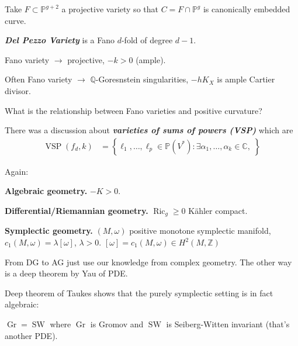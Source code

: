 Take $F\subset \mathbb{P}^{g+2}$ a projective variety so that $C=F \cap\mathbb{P}^g$ is  canonically embedded curve.

\begin{defn}\leavevmode
	\textit{\textbf{Del Pezzo Variety}} is a Fano $d$-fold of degree $d-1$.
\end{defn}

\begin{defn}\leavevmode
	Fano variety $\to $ projective, $-k>0$ (ample).
\end{defn}

\begin{remark}\leavevmode
	Often Fano variety $\to$ $\mathbb{Q}$-Goresnstein singularities, $-h K_X$ is ample Cartier divisor.
\end{remark}

\begin{question}\leavevmode
	What is the relationship between Fano varieties and positive curvature?
\end{question}

There was a discussion about \textit{\textbf{varieties of sums of powers (VSP)}} which are
 \begin{align*}
\operatorname{ V SP}(f_d,k)&=\left\{ \ell_1,\ldots,\ell_p \in \mathbb{P}( V^*):\exists \alpha_1,\ldots,\alpha_k \in \mathbb{C},\;  \right\} 
\end{align*}

Again:

{\color{3}\bfseries Algebraic geometry.}\hspace{.5em} $-K>0$.

 {\color{5}\bfseries Differential/Riemannian geometry.}\hspace{.5em} $\operatorname{Ric}_g \geq 0$ Kähler compact.

 {\color{2}\bfseries Symplectic geometry.}\hspace{.5em} $(M,\omega)$ positive monotone symplectic manifold, $c_1(M,\omega)=\lambda[\omega]$, $\lambda>0$. $[\omega] = c_1(M,\omega)\in H^{2}(M, \mathbb{Z})$

From DG to AG just use our knowledge from complex geometry. The other way is a deep theorem by Yau of PDE.

Deep theorem of Taukes shows that the purely symplectic setting is in fact algebraic:

\begin{thm}[Taukes]\leavevmode
$\operatorname{Gr}=\operatorname{SW}$ where $\operatorname{Gr}$ is Gromov and $\operatorname{SW}$ is Seiberg-Witten invariant (that's another PDE).
\end{thm}

